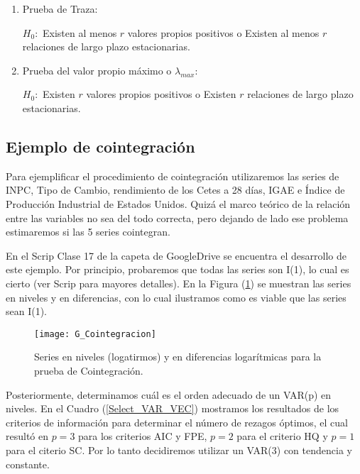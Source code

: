 \documentclass[
  a4paper,
]{article}
\begin{document}
\begin{enumerate}
    \item Prueba de Traza:
    
    $H_0 :$ Existen al menos $r$ valores propios positivos o Existen al menos $r$ relaciones de largo plazo estacionarias.
    
    \item Prueba del valor propio máximo o $\lambda_{max}$:
    
    $H_0 :$ Existen $r$ valores propios positivos o Existen $r$ relaciones de largo plazo estacionarias.
\end{enumerate}

\subsection{Ejemplo de cointegración}\label{ejemplo-de-cointegraciuxf3n}

Para ejemplificar el procedimiento de cointegración utilizaremos las
series de INPC, Tipo de Cambio, rendimiento de los Cetes a 28 días, IGAE
e Índice de Producción Industrial de Estados Unidos. Quizá el marco
teórico de la relación entre las variables no sea del todo correcta,
pero dejando de lado ese problema estimaremos si las 5 series
cointegran.

En el Scrip Clase 17 de la capeta de GoogleDrive se encuentra el
desarrollo de este ejemplo. Por principio, probaremos que todas las
series son I(1), lo cual es cierto (ver Scrip para mayores detalles). En
la Figura (\ref{G_Cointegracion}) se muestran las series en niveles y en
diferencias, con lo cual ilustramos como es viable que las series sean
I(1).

\begin{figure}
  \centering
    \texttt{[image: G\_Cointegracion]}
  \caption{Series en niveles (logatirmos) y en diferencias logarítmicas para la prueba de Cointegración.}
  \label{G_Cointegracion}
\end{figure}

Posteriormente, determinamos cuál es el orden adecuado de un VAR(p) en
niveles. En el Cuadro (\ref{Select_VAR_VEC}) mostramos los resultados de
los criterios de información para determinar el número de rezagos
óptimos, el cual resultó en \(p = 3\) para los criterios AIC y FPE,
\(p = 2\) para el criterio HQ y \(p = 1\) para el citerio SC. Por lo
tanto decidiremos utilizar un VAR(3) con tendencia y constante.
\end{document}
